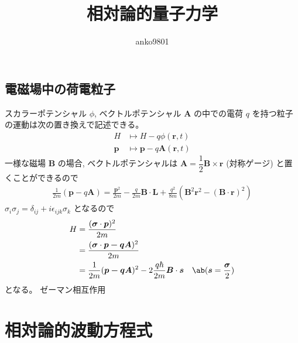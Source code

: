 \documentclass[uplatex,dvipdfmx,a4paper,11pt]{jlreq}
\title{相対論的量子力学}
\author{anko9801}
\theoremstyle{definition}
\newcommand{\rr}{\bm{r}}
\numberwithin{equation}{section}
\begin{document}
\maketitle
\tableofcontents
\clearpage

\subsection{電磁場中の荷電粒子}
スカラーポテンシャル $\phi$, ベクトルポテンシャル $\bm{A}$ の中での電荷 $q$ を持つ粒子の運動は次の置き換えで記述できる。
\begin{align}
  H      & \mapsto H - q\phi(\rr, t)        \\
  \bm{p} & \mapsto \bm{p} - q\bm{A}(\rr, t)
\end{align}
一様な磁場 $\bm{B}$ の場合, ベクトルポテンシャルは $\bm{A} = \dfrac{1}{2}\bm{B}\times\rr$ (対称ゲージ) と置くことができるので
\begin{align}
  \frac{1}{2m}(\bm{p} - q\bm{A}) = \frac{\bm{p}^2}{2m} - \frac{q}{2m}\bm{B}\cdot\bm{L} + \frac{q^2}{8m}(\bm{B}^2\rr^2 - (\bm{B}\cdot\rr)^2)
\end{align}
$\sigma_i\sigma_j = \delta_{ij} + i\epsilon_{ijk}\sigma_k$ となるので
\begin{align}
  H & = \frac{(\bm{\sigma}\cdot\bm{p})^2}{2m}                                                                        \\
    & = \frac{(\bm{\sigma}\cdot\bm{p - q\bm{A}})^2}{2m}                                                              \\
    & = \frac{1}{2m}(\bm{p - q\bm{A}})^2 - 2\frac{q\hbar}{2m}\bm{B}\cdot\bm{s} & \ab(\bm{s} = \frac{\bm{\sigma}}{2})
\end{align}
となる。
ゼーマン相互作用

\section{相対論的波動方程式}
\end{document}
